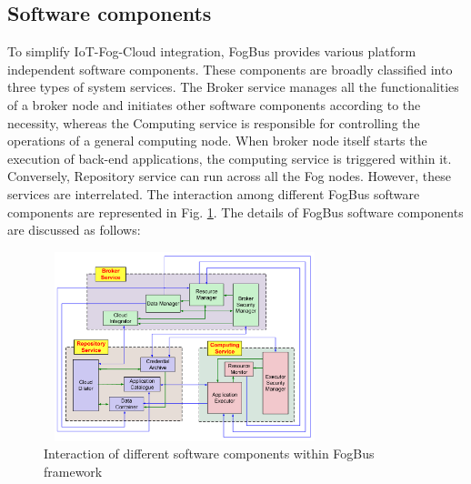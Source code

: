 \documentclass[final,5p,times,twocolumn]{elsarticle}
\begin{document}
\subsection{Software components}
To simplify IoT-Fog-Cloud integration, FogBus provides various platform independent software components. These components are broadly classified into three types of system services. The Broker service manages all the functionalities of a broker node and initiates other software components according to the necessity, whereas the Computing service is responsible for controlling the operations of a general computing node. When broker node itself starts the execution of back-end applications, the computing service is triggered within it. Conversely, Repository service can run across all the Fog nodes. However, these services are interrelated. The interaction among different FogBus software components are represented in Fig. \ref{Fig:software}. The details of FogBus software components are discussed as follows:      
%
\begin{figure}[t]
\centering 
\includegraphics[width=82mm, height=55mm]{Software.png}
\caption{Interaction of different software components within FogBus framework}
\label{Fig:software}
\end{figure}      
% 
\end{document}
